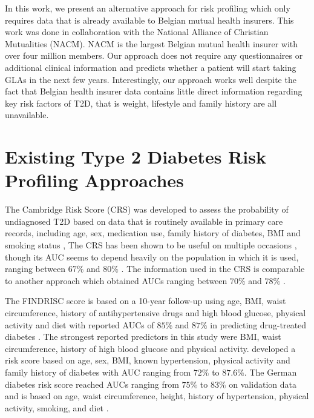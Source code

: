 \documentclass[twoside,11pt]{article}
\begin{document}
In this work, we present an alternative approach for risk profiling which only requires data that is already available to Belgian mutual health insurers. This work was done in  collaboration with the National Alliance of Christian Mutualities (NACM). NACM is the largest Belgian mutual health insurer with over four million members. Our approach does not require any questionnaires or additional clinical information and predicts whether a patient will start taking GLAs in the next few years. Interestingly, our approach works well despite the fact that Belgian health insurer data contains little direct information regarding key risk factors of T2D, that is weight, lifestyle and family history are all unavailable.


\section{Existing Type 2 Diabetes Risk Profiling Approaches} \label{sec:stateoftheart}
The Cambridge Risk Score (CRS) was developed to assess the probability of undiagnosed T2D based on data that is routinely available in primary care records, including age, sex, medication use, family history of diabetes, BMI and smoking status \citep{griffin2000diabetes}, The CRS has been shown to be useful on multiple occasions \citep{griffin2000diabetes, park2002performance, spijkerman2004performance}, though its AUC seems to depend heavily on the population in which it is used, ranging between $67\%$ \citep{spijkerman2004performance} and $80\%$ \citep{griffin2000diabetes}. The information used in the CRS is comparable to another approach which obtained AUCs ranging between $70\%$ and $78\%$ \citep{baan1999performance}.

The FINDRISC score is based on a 10-year follow-up using age, BMI, waist circumference, history of antihypertensive drugs and high blood glucose, physical activity and diet with reported AUCs of $85\%$ and $87\%$ in predicting drug-treated diabetes \citep{lindstrom2003diabetes}. The strongest reported predictors in this study were BMI, waist circumference, history of high blood glucose and physical activity. \citet{glumer2004danish} developed a risk score based on age, sex, BMI, known hypertension, physical activity and family history of diabetes with AUC ranging from $72\%$ to $87.6\%$. The German diabetes risk score reached AUCs ranging from $75\%$ to $83\%$ on validation data and is based on age, waist circumference, height, history of hypertension, physical activity, smoking, and diet \citep{schulze2007accurate}.
\end{document}
